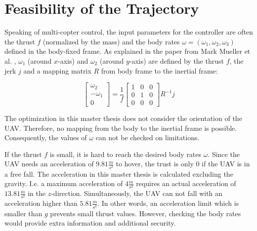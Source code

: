 \section{Feasibility of the Trajectory}

Speaking of multi-copter control, the input parameters for the controller are often the thrust $f$ (normalized by the mass) and the body rates $\omega = (\omega_1, \omega_2, \omega_3)$ defined in the body-fixed frame. As explained in the paper from Mark Mueller et al. \cite{mueller}, $\omega_1$ (around $x$-axis) and $\omega_2$ (around $y$-axis) are defined by the thrust $f$, the jerk $j$ and a mapping matrix $R$ from body frame to the inertial frame:

\begin{equation}
\begin{bmatrix}
   \omega_2 \\
  -\omega_1 \\
0
\end{bmatrix}
= \frac{1}{f}
\begin{bmatrix}
   1 & 0  &0\\
  0 & 1 & 0\\
0 & 0 &0
\end{bmatrix}
R^{-1}j
\label{equ:mueller}
\end{equation}


The optimization in this master thesis does not consider the orientation of the UAV. Therefore, no mapping from the body to the inertial frame is possible. Consequently, the values of $\omega$ can not be checked on limitations. \newline

If the thrust $f$ is small, it is hard to reach the desired body rates $\omega$. Since the UAV needs an acceleration of $9.81 \frac{m}{s^2}$ to hover, the trust is only 0 if the UAV is in a free fall. 
The acceleration in this master thesis is calculated excluding the gravity. I.e. a maximum acceleration of $4 \frac{m}{s^2}$ requires an actual acceleration of $13.81 \frac{m}{s^2}$ in the $z$-direction. Simultaneously, the UAV can not fall with an acceleration higher than $5.81 \frac{m}{s^2}$. In other words, an acceleration limit which is smaller than $g$ prevents small thrust values. However, checking the body rates would provide extra information and additional security.



